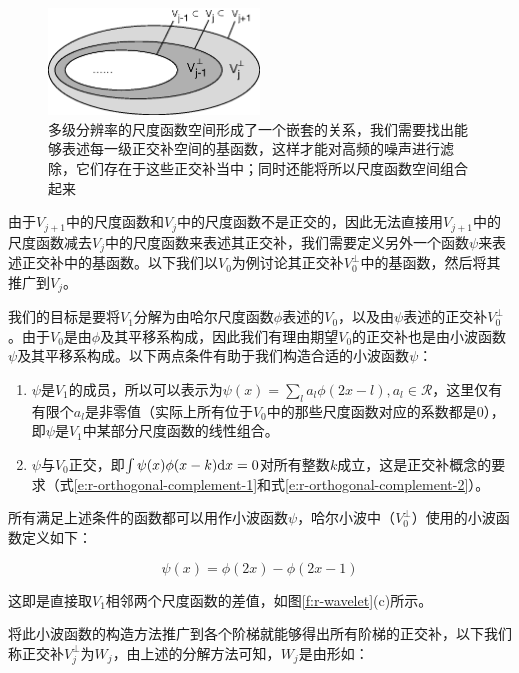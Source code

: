 \begin{figure}
	\sidecaption
	\includegraphics[width=0.5\textwidth]{figures/r/v-j}
	\caption{多级分辨率的尺度函数空间形成了一个嵌套的关系，我们需要找出能够表述每一级正交补空间的基函数，这样才能对高频的噪声进行滤除，它们存在于这些正交补当中；同时还能将所以尺度函数空间组合起来}
	\label{f:r-v-j}
\end{figure}

由于$V_{j+1}$中的尺度函数和$V_j$中的尺度函数不是正交的，因此无法直接用$V_{j+1}$中的尺度函数减去$V_j$中的尺度函数来表述其正交补，我们需要定义另外一个函数$\psi$来表述正交补中的基函数。以下我们以$V_0$为例讨论其正交补$V^{\perp}_0$中的基函数，然后将其推广到$V_j$。

我们的目标是要将$V_1$分解为由哈尔尺度函数$\phi$表述的$V_0$，以及由$\psi$表述的正交补$V^{\perp}_0$。由于$V_0$是由$\phi$及其平移系构成，因此我们有理由期望$V_0$的正交补也是由小波函数$\psi$及其平移系构成。以下两点条件有助于我们构造合适的小波函数$\psi$：

\begin{enumerate}
	\item $\psi$是$V_1$的成员，所以可以表示为$\psi(x)=\sum_{l}a_l\phi(2x-l),a_l\in\mathcal{R}$，这里仅有有限个$a_l$是非零值（实际上所有位于$V_0$中的那些尺度函数对应的系数都是0），即$\psi$是$V_1$中某部分尺度函数的线性组合。
	\item $\psi$与$V_0$正交，即$\int\psi(x)\phi(x-k){\rm d}x=0$对所有整数$k$成立，这是正交补概念的要求（式\ref{e:r-orthogonal-complement-1}和式\ref{e:r-orthogonal-complement-2}）。
\end{enumerate}

所有满足上述条件的函数都可以用作小波函数$\psi$，哈尔小波中（$V^{\perp}_0$）使用的小波函数定义如下：

\begin{equation}
	\psi(x)=\phi(2x)-\phi(2x-1)
\end{equation}

\noindent 这即是直接取$V_1$相邻两个尺度函数的差值，如图\ref{f:r-wavelet}(c)所示。

将此小波函数的构造方法推广到各个阶梯就能够得出所有阶梯的正交补，以下我们称正交补$V^{\perp}_j$为$W_j$，由上述的分解方法可知，$W_j$是由形如：

